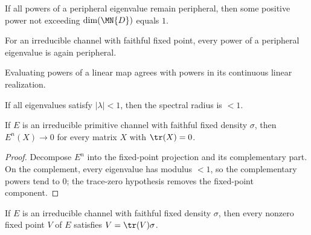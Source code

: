\begin{theorem}
    \leanok
    If all powers of a peripheral eigenvalue remain peripheral, then some
    positive power not exceeding $\dim(\MN{D})$ equals $1$.
\end{theorem}

\begin{theorem}
    \leanok
    For an irreducible channel with faithful fixed point, every power of a
    peripheral eigenvalue is again peripheral.
\end{theorem}

\begin{theorem}
    \leanok
    Evaluating powers of a linear map agrees with powers in its continuous
    linear realization.
\end{theorem}

\begin{theorem}
    \leanok
    If all eigenvalues satisfy $|\lambda|<1$, then the spectral radius is $<1$.
\end{theorem}

\begin{theorem}
    \label{thm:primitive_channel_pow_tendsto_zero_ch12}
    \leanok
    If $E$ is an irreducible primitive channel with faithful fixed density $\sigma$,
    then $E^n(X) \to 0$ for every matrix $X$ with $\tr(X)=0$.
\end{theorem}

\begin{proof}
    \leanok
    Decompose $E^n$ into the fixed-point projection and its complementary part.
    On the complement, every eigenvalue has modulus $<1$, so the complementary powers
    tend to $0$; the trace-zero hypothesis removes the fixed-point component.
\end{proof}

\begin{theorem}
    \label{thm:fixedPoint_eq_trace_smul_irreducible_channel_ch12}
    \leanok
    If $E$ is an irreducible channel with faithful fixed density $\sigma$, then every
    nonzero fixed point $V$ of $E$ satisfies $V = \tr(V) \sigma$.
\end{theorem}

